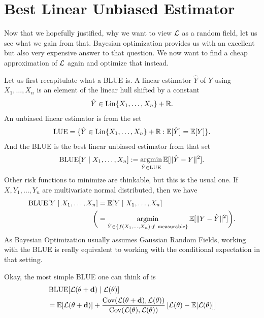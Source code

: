 \section{Best Linear Unbiased Estimator}

Now that we hopefully justified, why we want to view \(\mathcal{L}\) as a random field,
let us see what we gain from that. Bayesian optimization provides us with
an excellent but also very expensive answer to that question. We now want to
find a cheap approximation of \(\mathcal{L}\) again and optimize that instead.

Let us first recapitulate what a BLUE is. A linear estimator \(\hat{Y}\) of
\(Y\) using \(X_1,\dots,X_n\) is an element of the linear hull shifted by a
constant 
\begin{align*}
	\hat{Y}\in \operatorname{Lin}\{X_1,\dots,X_n\} + \mathbb{R}.
\end{align*}
An unbiased linear estimator is from the set
\begin{align*}
	\operatorname{LUE} = \{ \hat{Y} \in \operatorname{Lin}\{X_1,\dots,X_n\} + \mathbb{R} : \mathbb{E}[\hat{Y}] = \mathbb{E}[Y]\}.
\end{align*}
And the BLUE is the best linear unbiased estimator from that set
\begin{align*}
	\operatorname{BLUE}[Y\mid X_1,\dots, X_n] := \operatorname*{argmin}_{\hat{Y}\in\operatorname{LUE}} \mathbb{E}[\|\hat{Y} - Y\|^2].
\end{align*}
Other risk functions to minimize are thinkable, but this is the usual one. If
\(X,Y_1,\dots, Y_n\) are multivariate normal distributed, then we have
\begin{align*}
	\operatorname{BLUE}[Y\mid X_1,\dots,X_n]
	&= \mathbb{E}[Y\mid X_1,\dots, X_n]\\
	\bigg(&=
	\operatorname*{argmin}_{\hat{Y}\in\{f(X_1,\dots, X_n):f\ \text{measurable}\}} \mathbb{E}[\|Y-\hat{Y}\|^2]
	\bigg).
\end{align*}
As Bayesian Optimization usually assumes Gaussian Random Fields, working with
the BLUE is really equivalent to working with the conditional expectation in
that setting.

Okay, the most simple BLUE one can think of is
\begin{align*}
	&\operatorname{BLUE}[\mathcal{L}(\theta + \mathbf{d}) \mid \mathcal{L}(\theta)]\\
	&= \mathbb{E}[\mathcal{L}(\theta + \mathbf{d})]
	+ \frac{\operatorname{Cov}(\mathcal{L}(\theta+\mathbf{d}),\mathcal{L}(\theta))}{\operatorname{Cov}(\mathcal{L}(\theta), \mathcal{L}(\theta))}
	\left[\mathcal{L}(\theta) - \mathbb{E}[\mathcal{L}(\theta)]\right]
\end{align*}


